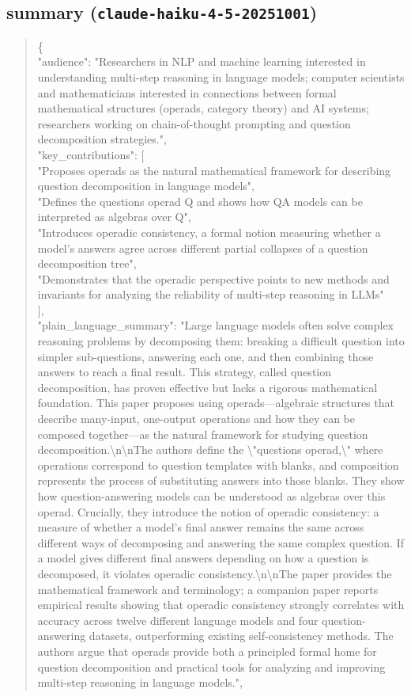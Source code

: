 \documentclass[11pt]{article}
\begin{document}
\subsection*{summary (\texttt{claude-haiku-4-5-20251001})}
\begin{quote}\small\ttfamily\raggedright
\{\\
  "audience": "Researchers in NLP and machine learning interested in understanding multi-step reasoning in language models; computer scientists and mathematicians interested in connections between formal mathematical structures (operads, category theory) and AI systems; researchers working on chain-of-thought prompting and question decomposition strategies.",\\
  "key\_contributions": [\\
    "Proposes operads as the natural mathematical framework for describing question decomposition in language models",\\
    "Defines the questions operad Q and shows how QA models can be interpreted as algebras over Q",\\
    "Introduces operadic consistency, a formal notion measuring whether a model's answers agree across different partial collapses of a question decomposition tree",\\
    "Demonstrates that the operadic perspective points to new methods and invariants for analyzing the reliability of multi-step reasoning in LLMs"\\
  ],\\
  "plain\_language\_summary": "Large language models often solve complex reasoning problems by decomposing them: breaking a difficult question into simpler sub-questions, answering each one, and then combining those answers to reach a final result. This strategy, called question decomposition, has proven effective but lacks a rigorous mathematical foundation. This paper proposes using operads---algebraic structures that describe many-input, one-output operations and how they can be composed together---as the natural framework for studying question decomposition.\textbackslash{}n\textbackslash{}nThe authors define the \textbackslash{}"questions operad,\textbackslash{}" where operations correspond to question templates with blanks, and composition represents the process of substituting answers into those blanks. They show how question-answering models can be understood as algebras over this operad. Crucially, they introduce the notion of operadic consistency: a measure of whether a model's final answer remains the same across different ways of decomposing and answering the same complex question. If a model gives different final answers depending on how a question is decomposed, it violates operadic consistency.\textbackslash{}n\textbackslash{}nThe paper provides the mathematical framework and terminology; a companion paper reports empirical results showing that operadic consistency strongly correlates with accuracy across twelve different language models and four question-answering datasets, outperforming existing self-consistency methods. The authors argue that operads provide both a principled formal home for question decomposition and practical tools for analyzing and improving multi-step reasoning in language models.",\\

\end{quote}
\end{document}
